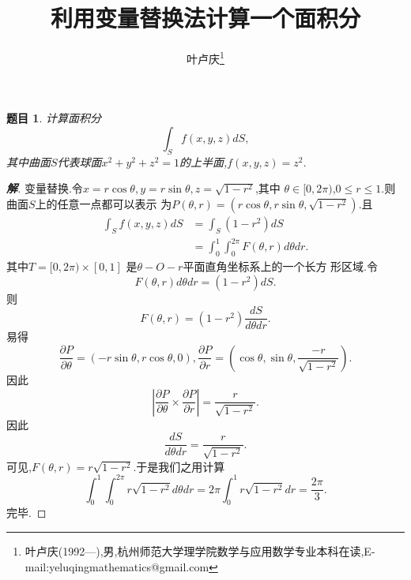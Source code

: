 \documentclass[a4paper]{article}
\newtheorem*{exe}{题目}
\newenvironment{exercise}
{\bigskip\begin{mdframed}\begin{exe}}
    {\end{exe}\end{mdframed}\bigskip}
\newcommand{\pa}{\partial} \newcommand{\Om}{\Omega}
\begin{document}
\title{\huge{\bf{利用变量替换法计算一个面积分}}} \author{\small{叶卢庆\footnote{叶卢庆(1992---),男,杭州师范大学理学院数学与应用数学专业本科在读,E-mail:yeluqingmathematics@gmail.com}}}
\maketitle
\begin{exercise}
计算面积分
$$
\int_S f(x,y,z)dS,
$$
其中曲面$S$代表球面$x^2+y^2+z^2=1$的上半面,$f(x,y,z)=z^2$.
\end{exercise}
\begin{proof}[\textbf{解}]
  变量替换.令$x=r\cos\theta,y=r\sin\theta,z=\sqrt{1-r^2}$,其中
  $\theta\in [0,2\pi)$,$0\leq r\leq 1$.则曲面$S$上的任意一点都可以表示
  为$P(\theta,r)=(r\cos\theta,r\sin\theta,\sqrt{1-r^2})$.且
  \begin{align*}
    \int_S f(x,y,z)dS&=\int_S (1-r^2)dS\\&=\int_{0}^{1}\int_{0}^{2\pi}F(\theta,r)d\theta dr.
  \end{align*}
其中$T=[0,2\pi)\times [0,1]$ 是$\theta-O-r$平面直角坐标系上的一个长方
形区域.令
$$
F(\theta,r)d\theta dr=(1-r^2)dS.
$$
则
$$
F(\theta,r)=(1-r^2) \frac{dS}{d\theta dr}.
$$
易得
$$
\frac{\pa P}{\pa \theta}=(-r\sin\theta,r\cos\theta,0),\frac{\pa P}{\pa
r}=(\cos\theta,\sin\theta,\frac{-r}{\sqrt{1-r^2}}).
$$
因此
$$
\left|\frac{\pa P}{\pa\theta}\times \frac{\pa P}{\pa r}\right|=\frac{r}{\sqrt{1-r^2}}.
$$
因此
$$
\frac{dS}{d\theta dr}=\frac{r}{\sqrt{1-r^2}}.
$$
可见,$F(\theta,r)=r \sqrt{1-r^2}$.于是我们之用计算
$$
\int_0^1\int_0^{2\pi}r \sqrt{1-r^2}d\theta dr=2\pi\int_{0}^{1}r
\sqrt{1-r^2}dr=\frac{2\pi}{3}.
$$
完毕.
\end{proof}
\end{document}
